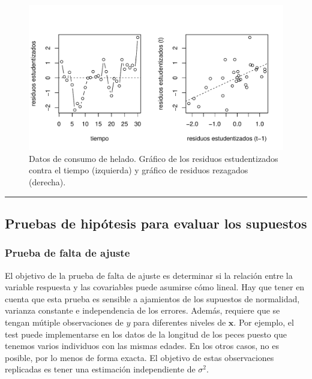 \documentclass[
]{article}
\begin{document}
\begin{figure}

{\centering \includegraphics{MLG1_files/figure-latex/heladosResiduos2-1} 

}

\caption{Datos de consumo de helado. Gráfico de los residuos estudentizados contra el tiempo (izquierda) y gráfico de residuos rezagados (derecha).}\label{fig:heladosResiduos2}
\end{figure}
\rule{\textwidth}{0.4pt}

\hypertarget{pruebas-de-hipuxf3tesis-para-evaluar-los-supuestos}{%
\subsection{Pruebas de hipótesis para evaluar los supuestos}\label{pruebas-de-hipuxf3tesis-para-evaluar-los-supuestos}}

\hypertarget{prueba-de-falta-de-ajuste}{%
\subsubsection{Prueba de falta de ajuste}\label{prueba-de-falta-de-ajuste}}

El objetivo de la prueba de falta de ajuste es determinar si la relación entre la variable respuesta y las covariables puede asumirse cómo lineal. Hay que tener en cuenta que esta prueba es sensible a ajamientos de los supuestos de normalidad, varianza constante e independencia de los errores. Además, requiere que se tengan mútiple observaciones de \(y\) para diferentes niveles de \(\boldsymbol x\). Por ejemplo, el test puede implementarse en los datos de la longitud de los peces puesto que tenemos varios individuos con las mismas edades. En los otros casos, no es posible, por lo menos de forma exacta. El objetivo de estas observaciones replicadas es tener una estimación independiente de \(\sigma^{2}\).
\end{document}
